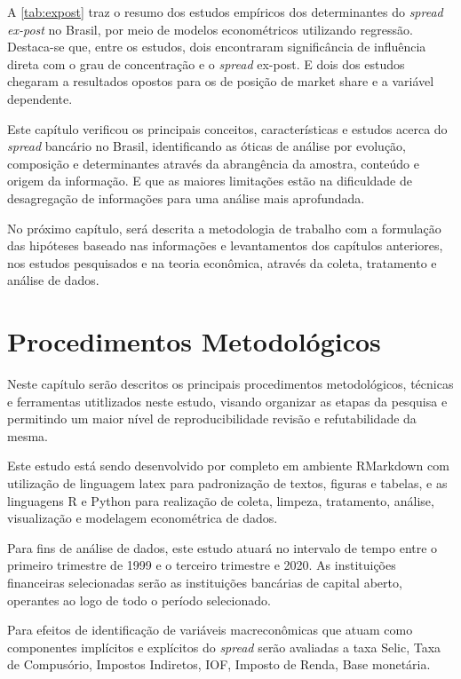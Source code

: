 \documentclass[12pt,openright,oneside,a4paper,chapter=TITLE,section=TITLE,subsection=TITLE,english,french,spanish,portugues,sumario=tradicional]{04-class-files/abntex2}
\begin{document}
A \autoref{tab:expost} traz o resumo dos estudos empíricos dos determinantes do
\emph{spread ex-post} no Brasil, por meio de modelos econométricos utilizando
regressão. Destaca-se que, entre os estudos, dois encontraram significância de
influência direta com o grau de concentração e o \emph{spread} ex-post. E dois dos
estudos chegaram a resultados opostos para os de posição de market share e a
variável dependente.

Este capítulo verificou os principais conceitos, características e estudos
acerca do \emph{spread} bancário no Brasil, identificando as óticas de análise por
evolução, composição e determinantes através da abrangência da amostra,
conteúdo e origem da informação. E que as maiores limitações estão na
dificuldade de desagregação de informações para uma análise mais aprofundada.

No próximo capítulo, será descrita a metodologia de trabalho com a formulação
das hipóteses baseado nas informações e levantamentos dos capítulos anteriores,
nos estudos pesquisados e na teoria econômica, através da coleta, tratamento e
análise de dados.

\chapter{Procedimentos Metodológicos}

Neste capítulo serão descritos os principais procedimentos metodológicos,
técnicas e ferramentas utitlizados neste estudo, visando organizar as etapas da
pesquisa e permitindo um maior nível de reproducibilidade revisão e
refutabilidade da mesma.

Este estudo está sendo desenvolvido por completo em ambiente RMarkdown com utilização de linguagem latex para padronização de textos, figuras e tabelas, e as linguagens R e Python para realização de coleta, limpeza, tratamento, análise, visualização e modelagem econométrica de dados.

Para fins de análise de dados, este estudo atuará no intervalo de tempo entre o primeiro trimestre de 1999 e o terceiro trimestre e 2020. As instituições financeiras selecionadas serão as instituições bancárias de capital aberto, operantes ao logo de todo o período selecionado.

Para efeitos de identificação de variáveis macreconômicas que atuam como componentes implícitos e explícitos do \emph{spread} serão avaliadas a taxa Selic, Taxa de Compusório, Impostos Indiretos, IOF, Imposto de Renda, Base monetária.
\end{document}
